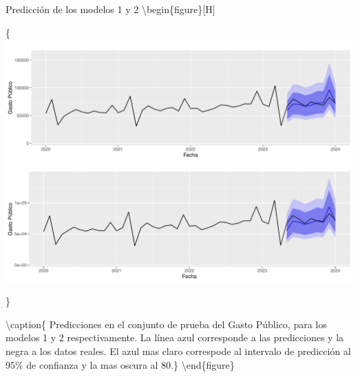 \documentclass[
  ignorenonframetext,
]{beamer}
\begin{document}
\begin{frame}{Predicción de los modelos 1 y 2}
\protect\hypertarget{predicciuxf3n-de-los-modelos-1-y-2}{}
\textbackslash begin\{figure\}{[}H{]}

\{\centering \includegraphics[width=0.95\linewidth]{presentacion_files/figure-beamer/unnamed-chunk-23-1}

\}

\textbackslash caption\{\label{pred12} Predicciones en el conjunto de
prueba del Gasto Público, para los modelos 1 y 2 respectivamente. La
línea azul corresponde a las predicciones y la negra a los datos reales.
El azul mas claro correspode al intervalo de predicción al 95\% de
confianza y la mas oscura al 80.\}\label{fig:unnamed-chunk-23}
\textbackslash end\{figure\}
\end{frame}
\end{document}
